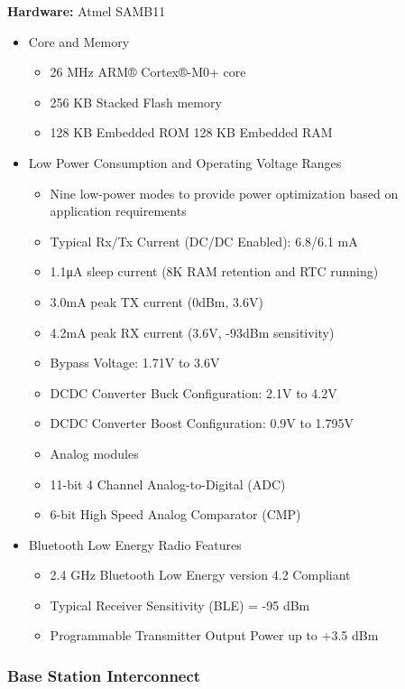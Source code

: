 \documentclass[journal,compsoc]{IEEEtran}
\begin{document}
\textbf {Hardware:} Atmel SAMB11

\begin{itemize}
  \item Core and Memory
    \begin{itemize}
      \item 26 MHz ARM® Cortex®-M0+ core
      \item 256 KB Stacked Flash memory
      \item 128 KB Embedded ROM
        128 KB Embedded RAM
    \end{itemize}
  \item Low Power Consumption and Operating Voltage Ranges
    \begin{itemize}
      \item Nine low-power modes to provide power optimization based on application requirements
      \item Typical Rx/Tx Current (DC/DC Enabled): 6.8/6.1 mA
      \item 1.1μA sleep current (8K RAM retention and RTC running)
      \item 3.0mA peak TX current (0dBm, 3.6V)
      \item 4.2mA peak RX current (3.6V, -93dBm sensitivity)
      \item Bypass Voltage: 1.71V to 3.6V
      \item DCDC Converter Buck Configuration: 2.1V to 4.2V
      \item DCDC Converter Boost Configuration: 0.9V to 1.795V
      \item Analog modules
      \item 11-bit 4 Channel Analog-to-Digital (ADC)
      \item 6-bit High Speed Analog Comparator (CMP)
    \end{itemize}
  \item Bluetooth Low Energy Radio Features
    \begin{itemize}
      \item 2.4 GHz Bluetooth Low Energy version 4.2 Compliant
      \item Typical Receiver Sensitivity (BLE) = -95 dBm
      \item Programmable Transmitter Output Power up to +3.5 dBm
    \end{itemize}
\end{itemize}

\subsubsection{Base Station Interconnect}
\end{document}
